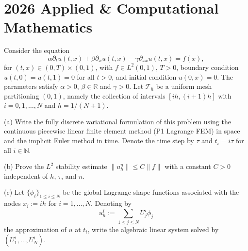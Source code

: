 \section{2026 Applied \& Computational Mathematics}

\begin{exercise}
\label{applied:2026:1}
Consider the equation
\[
\alpha \partial_t u(t,x)+\beta \partial_x u(t,x)-\gamma \partial_{xx}u(t,x)=f(x),
\]
for $(t,x)\in (0,T)\times (0,1)$, with $f\in L^2(0,1)$, $T>0$, boundary condition
$u(t,0)=u(t,1)=0$ for all $t>0$, and initial condition $u(0,x)=0$. The parameters satisfy
$\alpha>0$, $\beta\in \mathbb{R}$ and $\gamma>0$. Let $\mathcal{T}_h$ be a uniform mesh
partitioning $(0,1)$, namely the collection of intervals $[ih,(i+1)h]$ with
$i=0,1,\ldots,N$ and $h=1/(N+1)$.

(a) Write the fully discrete variational formulation of this problem using the continuous
piecewise linear finite element method (P1 Lagrange FEM) in space and the implicit Euler
method in time. Denote the time step by $\tau$ and $t_i=i\tau$ for all $i\in\mathbb{N}$.

(b) Prove the $L^2$ stability estimate $\|u_h^n\|\leq C\|f\|$ with a constant $C>0$
independent of $h$, $\tau$, and $n$.

(c) Let $\{\phi_i\}_{1\leq i\leq N}$ be the global Lagrange shape functions associated with
the nodes $x_i:=ih$ for $i=1,\ldots,N$. Denoting by
\[
u_h^i:=\sum_{1\leq j\leq N} U_j^i\phi_j
\]
the approximation of $u$ at $t_i$, write the algebraic linear system solved by
$(U_1^i,\ldots,U_N^i)$.
\end{exercise}

